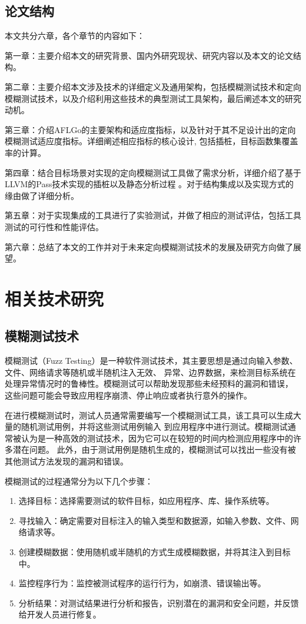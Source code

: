 \documentclass[bachelor]{njupthesis}
\begin{document}
\section{论文结构}
本文共分六章，各个章节的内容如下：

第一章：主要介绍本文的研究背景、国内外研究现状、研究内容以及本文的论文结构。

第二章：主要介绍本文涉及技术的详细定义及通用架构，包括模糊测试技术和定向模糊测试技术，以及介绍利用这些技术的典型测试工具架构，最后阐述本文的研究动机。

第三章：介绍AFLGo的主要架构和适应度指标，以及针对于其不足设计出的定向模糊测试适应度指标。详细阐述相应指标的核心设计,
包括插桩，目标函数集覆盖率的计算。

第四章：结合目标场景对实现的定向模糊测试工具做了需求分析，详细介绍了基于LLVM的Pass技术实现的插桩以及静态分析过程
。对于结构集成以及实现方式的缘由做了详细分析。

第五章：对于实现集成的工具进行了实验测试，并做了相应的测试评估，包括工具测试的可行性和性能评估。

第六章：总结了本文的工作并对于未来定向模糊测试技术的发展及研究方向做了展望。

\chapter{相关技术研究}
\section{模糊测试技术}
模糊测试（Fuzz Testing）是一种软件测试技术，其主要思想是通过向输入参数、文件、网络请求等随机或半随机注入无效、
异常、边界数据，来检测目标系统在处理异常情况时的鲁棒性。模糊测试可以帮助发现那些未经预料的漏洞和错误，
这些问题可能会导致应用程序崩溃、停止响应或者执行意外的操作。

在进行模糊测试时，测试人员通常需要编写一个模糊测试工具，该工具可以生成大量的随机测试用例，并将这些测试用例输入
到应用程序中进行测试。模糊测试通常被认为是一种高效的测试技术，因为它可以在较短的时间内检测应用程序中的许多潜在问题。
此外，由于测试用例是随机生成的，模糊测试可以找出一些没有被其他测试方法发现的漏洞和错误。

模糊测试的过程通常分为以下几个步骤：

\begin{enumerate}[label=(\arabic*)]
	\item 选择目标：选择需要测试的软件目标，如应用程序、库、操作系统等。
	\item 寻找输入：确定需要对目标注入的输入类型和数据源，如输入参数、文件、网络请求等。
	\item 创建模糊数据：使用随机或半随机的方式生成模糊数据，并将其注入到目标中。
	\item 监控程序行为：监控被测试程序的运行行为，如崩溃、错误输出等。
	\item 分析结果：对测试结果进行分析和报告，识别潜在的漏洞和安全问题，并反馈给开发人员进行修复。
\end{enumerate}
\end{document}
